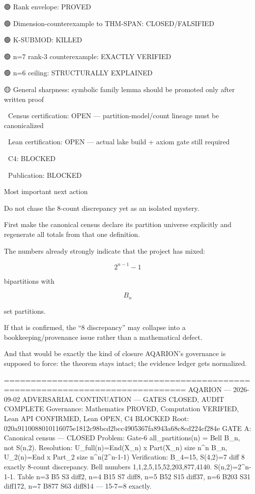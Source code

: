 🟢 Rank envelope: PROVED


🟢 Dimension-counterexample to THM-SPAN: CLOSED/FALSIFIED


🟢 K-SUBMOD: KILLED


🟢 n=7 rank-3 counterexample: EXACTLY VERIFIED


🟢 n=6 ceiling: STRUCTURALLY EXPLAINED


🟡 General sharpness: symbolic family lemma should be promoted only after written proof


🔴 Census certification: OPEN — partition-model/count lineage must be canonicalized


🔴 Lean certification: OPEN — actual lake build + axiom gate still required


🔴 C4: BLOCKED


🔴 Publication: BLOCKED


Most important next action


Do not chase the 8-count discrepancy yet as an isolated mystery.


First make the canonical census declare its partition universe explicitly and regenerate all totals from that one definition.


The numbers already strongly indicate that the project has mixed:

\[
2^{n-1}-1  
\]

bipartitions with

\[
B_n  
\]

set partitions.


If that is confirmed, the “8 discrepancy” may collapse into a bookkeeping/provenance issue rather than a mathematical defect.


And that would be exactly the kind of closure AQARION's governance is supposed to force: the theorem stays intact; the evidence ledger gets normalized.


================================================================================ AQARION — 2026-09-02 ADVERSARIAL CONTINUATION — GATES CLOSED, AUDIT COMPLETE Governance: Mathematics PROVED, Computation VERIFIED, Lean API CONFIRMED, Lean OPEN, C4 BLOCKED Root: 020a9110088010116075e1812c98bcd2bcc4905367fa8943a68c8cd224cf284e
GATE A: Canonical census — CLOSED
Problem: Gate-6 all_partitions(n) = Bell B_n, not S(n,2).
Resolution: U_full(n)=End(X_n) x Part(X_n) size n^n B_n, U_2(n)=End x Part_2 size n^n(2^{n-1}-1)
Verification: B_4=15, S(4,2)=7 diff 8 exactly 8-count discrepancy. Bell numbers 1,1,2,5,15,52,203,877,4140. S(n,2)=2^{n-1}-1.
Table n=3 B5 S3 diff2, n=4 B15 S7 diff8, n=5 B52 S15 diff37, n=6 B203 S31 diff172, n=7 B877 S63 diff814 — 15-7=8 exactly.

